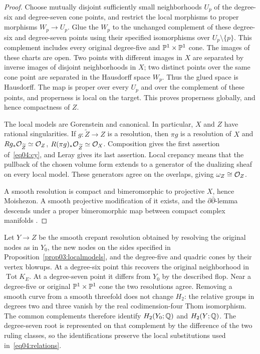 \begin{proof}
Choose mutually disjoint sufficiently small neighborhoods $U_p$ of the
degree-six and degree-seven cone points, and restrict the local morphisms to proper morphisms
$W_p\to U_p$.  Glue the $W_p$ to the unchanged complement of these
degree-six and degree-seven points using their specified isomorphisms
over $U_p\setminus\{p\}$.  This complement includes every original
degree-five and $\mathbb{P}^1\times\mathbb{P}^1$ cone.
The images of these charts are open.  Two points with different images in
$X$ are separated by inverse images of disjoint neighborhoods in $X$;
two distinct points over the same cone point are separated in the
Hausdorff space $W_p$.  Thus the glued space is Hausdorff.  The map is
proper over every $U_p$ and over the complement of these points,
and properness is local on the target.  This proves properness globally,
and hence compactness of $Z$.

The local models are Gorenstein and canonical.  In particular, $X$ and
$Z$ have rational singularities.  If $g:\widetilde Z\to Z$ is a
resolution, then $\pi g$ is a resolution of $X$ and
$Rg_*\mathcal{O}_{\widetilde Z}\simeq\mathcal{O}_Z$,
$R(\pi g)_*\mathcal{O}_{\widetilde Z}\simeq\mathcal{O}_X$.  Composition gives the
first assertion of~\eqref{eq04:cy}, and Leray gives its last assertion.
Local crepancy means that the pullback of the chosen volume form extends
to a generator of the dualizing sheaf on every local model.  These
generators agree on the overlaps, giving $\omega_Z\cong\mathcal{O}_Z$.

A smooth resolution is compact and bimeromorphic to projective $X$, hence
Moishezon.  A smooth projective modification of it exists, and the
$\partial\bar\partial$-lemma descends under a proper bimeromorphic map
between compact complex manifolds
\cite[Theorem~5.22 and Corollary~5.23]{dgms1975}.
\end{proof}

Let $Y\to Z$ be the smooth crepant resolution obtained by resolving the
original nodes as in $Y_0$, the
new nodes on the sides specified in Proposition~\ref{prop03:localmodels},
and the degree-five and quadric cones by their vertex blowups.
At a degree-six
point this recovers the original neighborhood in $\operatorname{Tot}K_E$.
At a degree-seven point it differs from $Y_0$ by the described flop.
Near a degree-five or original $\mathbb{P}^1\times\mathbb{P}^1$ cone the two
resolutions agree.
Removing a smooth curve from a smooth threefold does not change $H_2$:
the relative groups in degrees two and three vanish by the real
codimension-four Thom isomorphism.  The common complements therefore
identify $H_2(Y_0;\mathbb{Q})$ and $H_2(Y;\mathbb{Q})$.  The degree-seven root is
represented on that complement by the difference of the two ruling
classes, so the identifications preserve the local substitutions used
in~\eqref{eq04:relations}.

